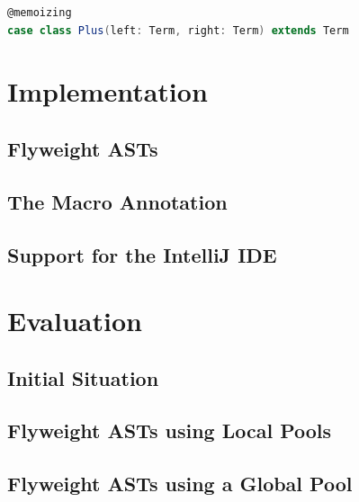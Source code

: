 \documentclass[11pt]{article}
\begin{document}
    \begin{lstlisting}[language=Scala, caption=One possible way to use macro annotations to automatically generate code in listing 3.]
@memoizing
case class Plus(left: Term, right: Term) extends Term
    \end{lstlisting}

    \section{Implementation}

    \subsection{Flyweight ASTs}

    \subsection{The Macro Annotation}

    \subsection{Support for the IntelliJ IDE}

    \section{Evaluation}

    \subsection{Initial Situation}

    \subsection{Flyweight ASTs using Local Pools}

    \subsection{Flyweight ASTs using a Global Pool}

    \printbibliography
    
\end{document}
